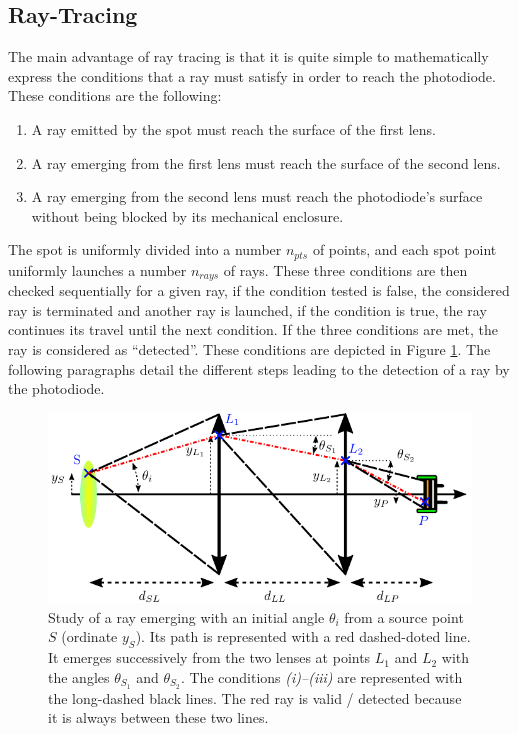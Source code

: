 \subsection{Ray-Tracing}

The main advantage of ray tracing is that it is quite simple to mathematically express the conditions that a ray must satisfy in order to reach the photodiode. These conditions are the following:
\begin{enumerate}[label=\textit{(\roman*)}]
	\item A ray emitted by the spot must reach the surface of the first lens.
	\item A ray emerging from the first lens must reach the surface of the second lens.
	\item A ray emerging from the second lens must reach the photodiode's surface without being blocked by its mechanical enclosure.
\end{enumerate}

The spot is uniformly divided into a number $n_{pts}$ of points, and each spot point uniformly launches a number $n_{rays}$ of rays. These three conditions are then checked sequentially for a given ray, if the condition tested is false, the considered ray is terminated and another ray is launched, if the condition is true, the ray continues its travel until the next condition. If the three conditions are met, the ray is considered as \enquote{detected}. These conditions are depicted in Figure \ref{anfig:optics:collecting_cond}. The following paragraphs detail the different steps leading to the detection of a ray by the photodiode.

\begin{figure}
	\centering
	\includegraphics{2_appendices/optical_figures/collecting_cond_converted.pdf}
	\caption[Study of a ray emerging with an initial angle $\theta_i$ from a source point $S$.]{Study of a ray emerging with an initial angle $\theta_i$ from a source point $S$ (ordinate $y_S$). Its path is represented with a red dashed-doted line. It emerges successively from the two lenses at points $L_1$ and $L_2$ with the angles $\theta_{S_1}$ and $\theta_{S_2}$. The conditions \textit{(i)--(iii)} are represented with the long-dashed black lines. The red ray is valid / detected because it is always between these two lines.}
	\label{anfig:optics:collecting_cond}
\end{figure}

